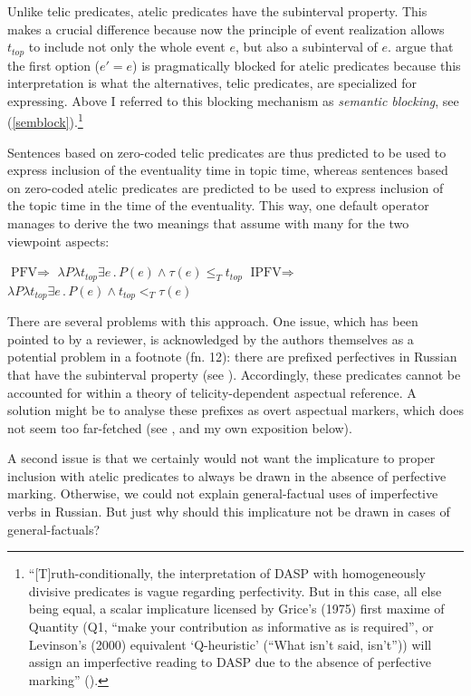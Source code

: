 \documentclass[output=paper,colorlinks,citecolor=brown]{langscibook}
\begin{document}
Unlike telic predicates, atelic predicates have the
subinterval property. This makes a crucial difference because now the principle of event realization allows 
$t_{top}$ to include
not only the whole event $e$, but also a subinterval of $e$.
\citet{Bohne2004} argue that the first
option ($e' = e$) is pragmatically blocked for atelic predicates because this interpretation is what the alternatives, telic predicates, are specialized for expressing. Above I referred to this blocking mechanism as \textit{semantic blocking}, see (\ref{semblock}).\footnote{``[T]ruth-conditionally, the interpretation of DASP with homogeneously divisive predicates is vague regarding perfectivity. But in this case, all else being equal, a scalar implicature licensed by Grice's (1975) first maxime of Quantity (Q1, ``make your contribution as informative as is required'', or Levinson's (2000) equivalent `Q-heuristic' (``What isn't said, isn't'')) will assign an imperfective reading to DASP due to the absence of perfective marking'' (\citealt[287--288]{Bohne2004}).}    

Sentences based on zero-coded telic predicates are thus predicted to be used to express inclusion of the eventuality time in topic time,
whereas sentences based on zero-coded atelic predicates are predicted to be used to express inclusion of the topic time in the time of the eventuality. This way, one default operator manages to derive the two meanings that \citet[280]{Bohne2004} assume with many for the two viewpoint aspects:

\ea\label{bohneaspects} 
\ea
$\text{PFV} \Rightarrow$ $\lambda P \lambda t_{top} \exists e \,.\, P(e) \wedge \tau(e) \leq_T t_{top}$
\ex $ \text{IPFV} \Rightarrow$ $\lambda P \lambda t_{top} \exists e \,.\, P(e) \wedge t_{top} <_T \tau(e)$ \label{bohneaspectsb} 
\z
\z  

\noindent There are several problems with this approach.
One issue, which has been pointed to by a reviewer, is acknowledged by the authors themselves as a potential problem in a footnote (fn. 12):  
there are prefixed perfectives in Russian that have the subinterval property (see \citealt{Filip1999}). Accordingly, these predicates cannot be accounted for within a theory of telicity-dependent aspectual reference. A solution might be to analyse these prefixes as overt aspectual markers, which does not seem too far-fetched (see \citealt{Dickey2011}, and my own exposition below).   

A second issue is that we certainly would not want the implicature to proper inclusion with atelic predicates to always be drawn in the absence of perfective marking. Otherwise, we could not explain general-factual uses of imperfective verbs in Russian. But just why should this implicature not be drawn in cases of general-factuals?  
\end{document}
